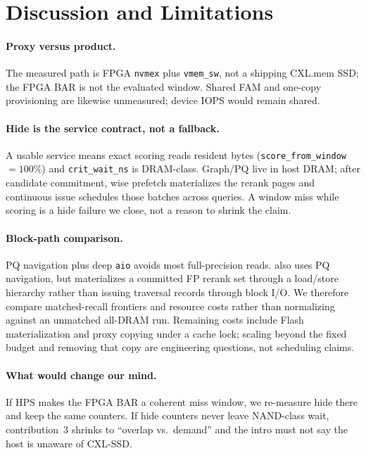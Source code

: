 \section{Discussion and Limitations}
\label{sec:discuss}

\paragraph{Proxy versus product.}
The measured path is FPGA \texttt{nvmex} plus \texttt{vmem\_sw}, not a shipping CXL.mem SSD; the FPGA BAR is not the evaluated window.
Shared FAM and one-copy provisioning are likewise unmeasured; device IOPS would remain shared.

\paragraph{Hide is the service contract, not a fallback.}
A usable service means exact scoring reads resident bytes (\texttt{score\_from\_window}${}=100\%$) and \texttt{crit\_wait\_ns} is DRAM-class.
Graph/PQ live in host DRAM; after candidate commitment, wise prefetch materializes the rerank pages and continuous issue schedules those batches across queries.
A window miss while scoring is a hide failure we close, not a reason to shrink the claim.

\paragraph{Block-path comparison.}
PQ navigation plus deep \texttt{aio} avoids most full-precision reads.
\sys{} also uses PQ navigation, but materializes a committed FP rerank set through a load/store hierarchy rather than issuing traversal records through block I/O.
We therefore compare matched-recall frontiers and resource costs rather than
normalizing against an unmatched all-DRAM run. Remaining costs include Flash
materialization and proxy copying under a cache lock; scaling beyond the fixed
budget and removing that copy are engineering questions, not scheduling claims.

\paragraph{What would change our mind.}
If HPS makes the FPGA BAR a coherent miss window, we re-measure hide there and keep the same counters.
If hide counters never leave NAND-class wait, contribution~3 shrinks to ``overlap vs.\ demand'' and the intro must not say the host is unaware of CXL-SSD.
